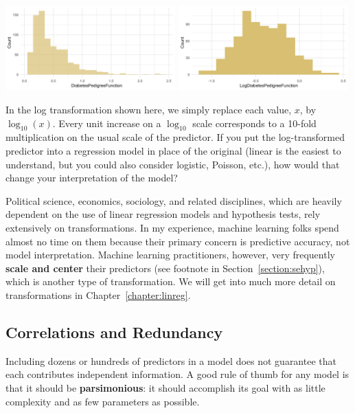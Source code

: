\begin{center}
\includegraphics[width=0.49\textwidth]{img/pima-diab-ped-function.png} \includegraphics[width=0.49\textwidth]{img/pima-diab-ped-function-log.png}
\end{center}

\begin{question}{}
In the log transformation shown here, we simply replace each value, $x$, by $\log_{10}(x)$. Every unit increase on a $\log_{10}$ scale corresponds to a 10-fold multiplication on the usual scale of the predictor. If you put the log-transformed predictor into a regression model in place of the original (linear is the easiest to understand, but you could also consider logistic, Poisson, etc.), how would that change your interpretation of the model? 
\end{question}

Political science, economics, sociology, and related disciplines, which are heavily dependent on the use of linear regression models and hypothesis tests, rely extensively on transformations. In my experience, machine learning folks spend almost no time on them because their primary concern is predictive accuracy, not model interpretation. Machine learning practitioners, however, very frequently \textbf{scale and center} their predictors (see footnote in Section~\ref{section:sehyp}), which is another type of transformation. We will get into much more detail on transformations in Chapter~\ref{chapter:linreg}. 

\subsection{Correlations and Redundancy \label{section:redund}}

Including dozens or hundreds of predictors in a model does not guarantee that each contributes independent information. A good rule of thumb for any model is that it should be \textbf{parsimonious}: it should accomplish its goal with as little complexity and as few parameters as possible.

